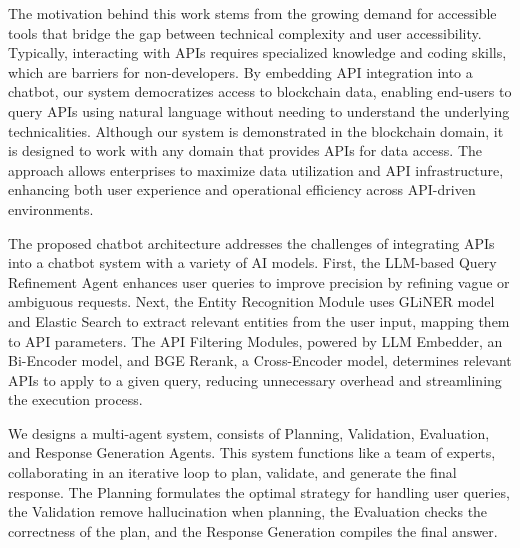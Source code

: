 \documentclass[runningheads]{llncs}
\begin{document}
The motivation behind this work stems from the growing demand for accessible tools that bridge the gap between technical complexity and user accessibility. Typically, interacting with APIs requires specialized knowledge and coding skills, which are barriers for non-developers. By embedding API integration into a chatbot, our system democratizes access to blockchain data, enabling end-users to query APIs using natural language without needing to understand the underlying technicalities. %
Although our system is demonstrated in the blockchain domain, it is designed to work with any domain that provides APIs for data access. The approach allows enterprises to maximize data utilization and API infrastructure, enhancing both user experience and operational efficiency across API-driven environments. %

The proposed chatbot architecture addresses the challenges of integrating APIs into a chatbot system with a variety of AI models. First, the LLM-based Query Refinement Agent enhances user queries to improve precision by refining vague or ambiguous requests. Next, the Entity Recognition Module uses GLiNER model and Elastic Search to extract relevant entities from the user input, mapping them to API parameters. The API Filtering Modules, powered by LLM Embedder, an Bi-Encoder model, and BGE Rerank, a Cross-Encoder model, determines relevant APIs to apply to a given query, reducing unnecessary overhead and streamlining the execution process. %

We designs a multi-agent system, consists of Planning, Validation, Evaluation, and Response Generation Agents. This system functions like a team of experts, collaborating in an iterative loop to plan, validate, and generate the final response. The Planning formulates the optimal strategy for handling user queries, the Validation remove hallucination when planning, the Evaluation checks the correctness of the plan, and the Response Generation compiles the final answer.%
\end{document}
